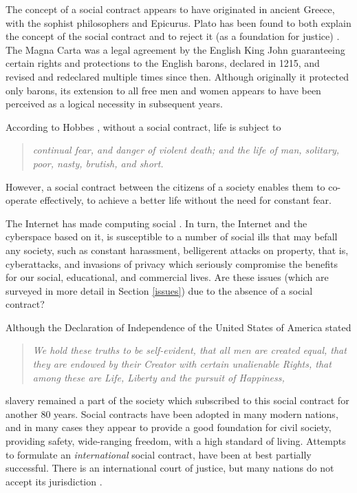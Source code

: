 \iffalse
The concept of a social contract appears to have originated in ancient
Greece, with the sophist philosophers and Epicurus. Plato has been
found to both explain the concept of the social contract and to reject
it (as a foundation for justice)  \cite{Plato5} .
The Magna Carta was a legal agreement by the English King John
guaranteeing certain rights and protections to the English barons, 
declared in 1215, and revised and redeclared
multiple times since then. Although originally it protected only barons,
its extension to all free men and women appears to have been perceived
as a logical necessity in subsequent years.

According to Hobbes \cite{Leviathan}, without a social contract, life is subject to
\begin{quote}\em
continual fear, and danger of violent death; and the life of man, solitary, poor, nasty, brutish, and short.
\end{quote}
However, a social contract between the citizens of a society enables them to co-operate
effectively, to achieve a better life without the need for constant fear.

The Internet has made computing social \cite{parameswaran2007social}. In
turn, the Internet and the cyberspace based on it, is susceptible to
a number of social ills that may befall any society, such as constant
harassment, belligerent attacks on property, that is, cyberattacks,
and invasions of privacy which seriously compromise the benefits for our
social, educational, and commercial lives. Are these issues (which are
surveyed in more detail in Section \ref{issues}) due to the absence
of a social contract?

Although the Declaration of Independence of the United States of America stated
\begin{quote}\em
We hold these truths to be self-evident, that all men are created equal,
that they are endowed by their Creator with certain unalienable Rights,
that among these are Life, Liberty and the pursuit of Happiness,
\end{quote}
slavery remained a part of the society which subscribed to this social contract
for another 80 years. 
%
Social contracts have been adopted in many modern nations, and in many cases they
appear to provide a good foundation for civil society, providing safety, wide-ranging 
freedom, with a high standard of living. Attempts to formulate an {\em international}
social contract, have been at best partially successful. There is an international court
of justice, but many nations do not accept its jurisdiction \cite{Robertson}.

